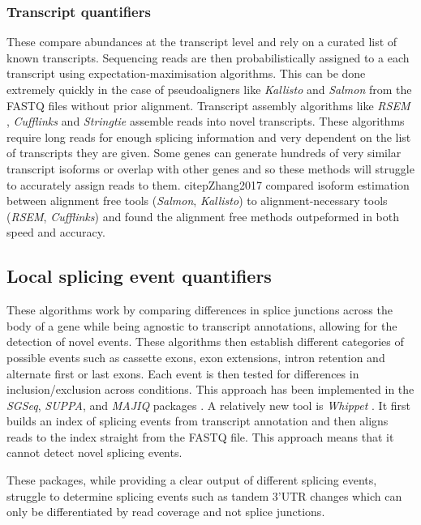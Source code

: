 \subsubsection{Transcript quantifiers}
These compare abundances at the transcript level and rely on a curated list of known transcripts. Sequencing reads are then probabilistically assigned to a each transcript using expectation-maximisation algorithms. This can be done extremely quickly in the case of pseudoaligners like \textit{Kallisto} \citep{Bray2016} and \textit{Salmon} \citep{Patro2017} from the FASTQ files without prior alignment. Transcript assembly algorithms like \textit{RSEM} \citep{Li2011}, \textit{Cufflinks} \citep{Trapnell2010} and \textit{Stringtie} \citep{Pertea2015}  assemble reads into novel transcripts. These algorithms require long reads for enough splicing information and very dependent on the list of transcripts they are given. Some genes can generate hundreds of very similar transcript isoforms or overlap with other genes and so these methods will struggle to accurately assign reads to them.
citep{Zhang2017} compared isoform estimation between alignment free tools (\textit{Salmon},\textit{ Kallisto}) to alignment-necessary tools (\textit{RSEM}, \textit{Cufflinks}) and found the alignment free methods outpeformed in both speed and accuracy.


\subsection{Local splicing event quantifiers}
These algorithms work by comparing differences in splice junctions across the body of a gene while being agnostic to transcript annotations, allowing for the detection of novel events. These algorithms then establish different categories of possible events such as cassette exons, exon extensions, intron retention and alternate first or last exons. Each event is then tested for differences in inclusion/exclusion across conditions. This approach has been implemented in the  \textit{SGSeq}, \textit{SUPPA}, and \textit{MAJIQ} packages \citep{Goldstein2016,Alamancos2015,Vaquero-Garcia2016}. 
A relatively new tool is \textit{Whippet} \citep{Sterne-Weiler2018a}. It first builds an index of splicing events from transcript annotation and then aligns reads to the index straight from the FASTQ file. This approach means that it cannot detect novel splicing events.

These packages, while providing a clear output of different splicing events, struggle to determine splicing events such as tandem 3'UTR changes which can only be differentiated by read coverage and not splice junctions.

